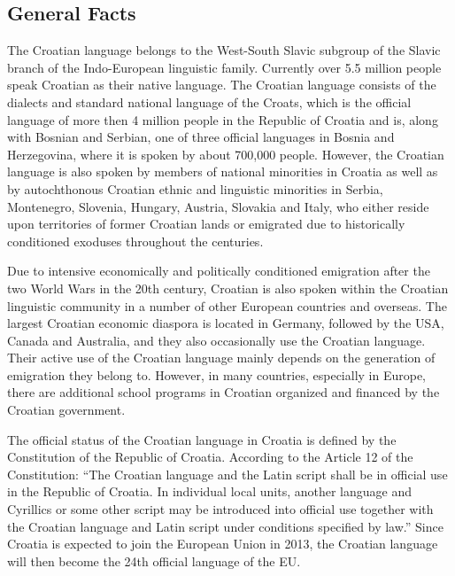 \clearpage


\begin{multicols}{2}

\subsection{General Facts}

The Croatian language belongs to the West-South Slavic subgroup of the Slavic branch of the Indo-European linguistic family. Currently over 5.5 million people speak Croatian as their native language. The Croatian language consists of the dialects and standard national language of the Croats, which is the official language of more then 4 million people in the Republic of Croatia and is, along with Bosnian and Serbian, one of three official languages in Bosnia and Herzegovina, where it is spoken by about 700,000 people. However, the Croatian language is also spoken by members of national minorities in Croatia as well as by autochthonous Croatian ethnic and linguistic minorities in Serbia, Montenegro, Slovenia, Hungary, Austria, Slovakia and Italy, who either reside upon territories of former Croatian lands or emigrated due to historically conditioned exoduses throughout the centuries. 


Due to intensive economically and politically conditioned emigration after the two World Wars in the 20th century, Croatian is also spoken within the Croatian linguistic community in a number of other European countries and overseas. The largest Croatian economic diaspora is located in Germany, followed by the USA, Canada and Australia, and they also occasionally use the Croatian language. Their active use of the Croatian language mainly depends on the generation of emigration they belong to. However, in many countries, especially in Europe, there are additional school programs in Croatian organized and financed by the Croatian government.

The official status of the Croatian language in Croatia is defined by the Constitution of the Republic of Croatia. According to the Article 12 of the Constitution: “The Croatian language and the Latin script shall be in official use in the Republic of Croatia. In individual local units, another language and Cyrillics or some other script may be introduced into official use together with the Croatian language and Latin script under conditions specified by law.” Since Croatia is expected to join the European Union in 2013, the Croatian language will then become the 24th official language of the EU.


\end{multicols}
